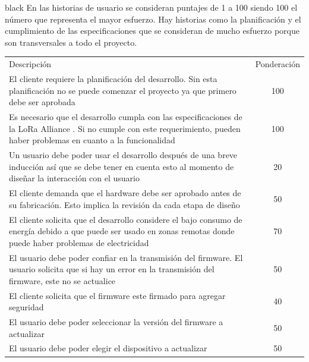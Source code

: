 \documentclass[11pt]{charter}
\begin{document}
\begin{consigna}{black}
En las historias de usuario se consideran puntajes de 1 a 100 siendo 100 el número que representa el mayor esfuerzo. Hay historias como la planificación y el cumplimiento de las especificaciones que se consideran de mucho esfuerzo porque son transversales a todo el proyecto. 
\begin{table}[htpb]
	\centering
	\begin{tabularx}{\linewidth}{@{}|X|c|@{}}
		\hline
		\rowcolor[HTML]{C0C0C0} 
		\multicolumn{2}{|c|}{\cellcolor[HTML]{C0C0C0}Historias de usuarios (\textit{Product Backlog})} \\ \hline
		\rowcolor[HTML]{C0C0C0} 
		Descripción &
		\multicolumn{1}{c|}{\cellcolor[HTML]{C0C0C0}Ponderación} \\ \hline
		El cliente requiere la planificación del desarrollo. Sin esta planificación no se puede comenzar el proyecto ya que primero debe ser aprobada & 100 \\ \hline
		Es necesario que el desarrollo cumpla con las especificaciones de la LoRa Alliance \textregistered. Si no cumple con este requerimiento, pueden haber problemas en cuanto a la funcionalidad & 100 \\ \hline
		Un usuario debe poder usar el desarrollo después de una breve inducción así que se debe tener en cuenta esto al momento de diseñar la interacción con el usuario & 20 \\ \hline
		El cliente demanda que el hardware debe ser aprobado antes de su fabricación. Esto implica la revisión da cada etapa de diseño & 50 \\ \hline
		El cliente solicita que el desarrollo considere el bajo consumo de energía debido a que puede ser usado en zonas remotas donde puede haber problemas de electricidad & 70 \\ \hline
		El usuario debe poder confiar en la transmisión del firmware. El usuario solicita que si hay un error en la transmisión del firmware, este no se actualice & 50 \\ \hline
		El cliente solicita que el firmware este firmado para agregar seguridad & 40 \\ \hline
		El usuario debe poder seleccionar la versión del firmware a actualizar & 50\\ \hline
		El usuario debe poder elegir el dispositivo a actualizar & 50 \\ \hline
	\end{tabularx}%
\end{table}


\end{consigna}
\end{document}

